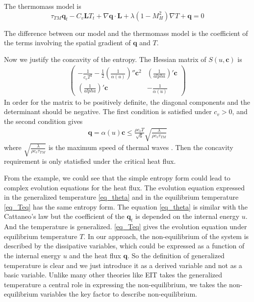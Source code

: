 \documentclass[a4paper]{article}
\begin{document}
The thermomass model is 
\begin{equation}
\tau_{TM} \mathbf{q}_t-C_v \mathbf{L}T_t+\nabla \mathbf{q} \cdot \mathbf{L}+\lambda(1-M_H^2)\nabla T+\mathbf{q}=0
\end{equation}

The difference between our model and the thermomass model is the coefficient of the terms involving the spatial gradient of $\mathbf{q}$ and $T$.

Now we justify the concavity of the entropy. The Hessian matrix of $S(u,\mathbf{c})$ is
\begin{eqnarray}
\left( \begin{array}{ll} -\frac{1}{c_v T^2}-\frac{1}{2}(\frac{1}{\alpha(u)})'' \mathbf{c}^2 & (\frac{1}{alpha})'\mathbf{c} \\ (\frac{1}{alpha})'\mathbf{c} & -\frac{1}{\alpha(u)} \end{array} \right)
\end{eqnarray}
In order for the matrix to be positively definite, the diagonal components and the determinant should be negative. The first condition is satisfied under $c_v>0$, and the second condition gives
\begin{eqnarray}
\mathbf{q}=\alpha(u)\mathbf{c} \le \frac{\rho c_v T}{\sqrt{6}} \sqrt{\frac{\lambda}{\rho c_v \tau_{TM}}}
\end{eqnarray}
where $\sqrt{\frac{\lambda}{\rho c_v \tau_{TM}}}$ is the maximum speed of thermal waves \cite{EIT}. Then the concavity requirement is only statisfied under the critical heat flux.


From the example, we could see that the simple entropy form could lead to complex evolution equations for the heat flux. The evolution equation expressed in the generalized temperature \eqref{eq_theta} and in the equilibrium temperature \eqref{eq_Teq} has the same entropy form. The equation  \eqref{eq_theta} is similar with the Cattaneo's law but the coefficient of the $\mathbf{q}_t$ is depended on the internal energy $u$. And the temperature is generalized. \eqref{eq_Teq} gives the evolution equation under equilibrium temperature $T$. In our approach, the non-equilibrium of the system is described by the dissipative variables, which could be expressed as a function of the internal energy $u$ and the heat flux $\mathbf{q}$. So the definition of generalized temperature is clear and we just introduce it as a derived variable and not as a basic variable. Unlike many other theories like EIT takes the generalized temperature a central role in expressing the non-equilibrium, we takes the non-equilibrium variables the key factor to describe non-equilibrium.
\end{document}
